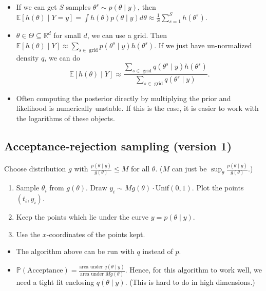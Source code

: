 \documentclass[twoside]{article}
\newcommand{\dis}{\displaystyle}
\newcommand\bbE{\mathbb{E}}
\newcommand\bbP{\mathbb{P}}
\newcommand\bbR{\mathbb{R}}
\def\t{\theta}
\newcommand\T{\Theta}
\begin{document}
\begin{itemize}
\item If we can get $S$ samples $\t^s \sim p(\t \mid y)$, then $\bbE [h(\t) \mid Y = y] = \dis\int h(\t) p(\t \mid y) d\t \approx \dis\frac{1}{S}\sum_{s=1}^S h(\t^s)$.

\item $\t \in \T \subseteq \bbR^d$ for small $d$, we can use a grid. Then $\bbE [h(\t) \mid Y] \approx \dis\sum_{s \in \text{ grid}} p(\t^s \mid y)h(\t^s)$. If we just have un-normalized density $q$, we can do
\begin{equation*}
\bbE [h(\t) \mid Y] \approx \frac{\dis\sum_{s \in \text{ grid}} q(\t^s \mid y)h(\t^s)}{\dis\sum_{s \in \text{ grid}} q(\t^s \mid y)}.
\end{equation*}

\item Often computing the posterior directly by multiplying the prior and likelihood is numerically unstable. If this is the case, it is easier to work with the logarithms of these objects.

\end{itemize}

\subsection*{Acceptance-rejection sampling (version 1)}
Choose distribution $g$ with $\dis\frac{p(\t \mid y)}{g(\t)} \leq M$ for all $\t$. ($M$ can just be $\sup_\t \dis\frac{p(\t \mid y)}{g(\t)}$.)
\begin{enumerate}
\item Sample $\t_i$ from $g(\t)$. Draw $y_i \sim Mg(\t) \cdot \text{Unif}(0,1)$. Plot the points $(t_i, y_i)$.
\item Keep the points which lie under the curve $y = p(\t \mid y)$.
\item Use the $x$-coordinates of the points kept.
\end{enumerate}

\begin{itemize}
\item The algorithm above can be run with $q$ instead of $p$.

\item $\bbP (\text{Acceptance}) = \dis\frac{\text{area under } q(\t \mid y)}{\text{area under } Mg(\t)}$. Hence, for this algorithm to work well, we need a tight fit enclosing $q(\t \mid y)$. (This is hard to do in high dimensions.)
\end{itemize}
\end{document}

